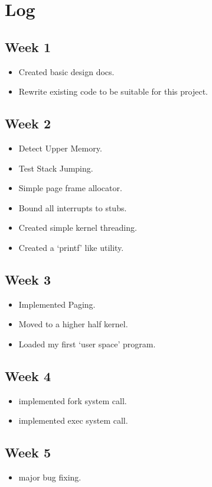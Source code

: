 \documentclass[a4paper]{report}
\begin{document}
\section{Log}


\subsection*{Week 1}
\begin{itemize}
\item Created basic design docs.
\item Rewrite existing code to be suitable for this project.
\end{itemize}

\subsection*{Week 2}
\begin{itemize}
\item Detect Upper Memory.
\item Test Stack Jumping.
\item Simple page frame allocator.
\item Bound all interrupts to stubs.
\item Created simple kernel threading.
\item Created a `printf' like utility.
\end{itemize}

\subsection*{Week 3}
\begin{itemize}
\item Implemented Paging.
\item Moved to a higher half kernel.
\item Loaded my first `user space' program.
\end{itemize}

\subsection*{Week 4}
\begin{itemize}
\item implemented fork system call.
\item implemented exec system call.
\end{itemize}

\subsection*{Week 5}
\begin{itemize}
\item major bug fixing.
\end{itemize}
\end{document}
